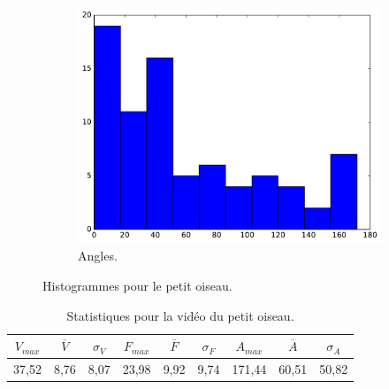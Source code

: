 \begin{appendices}
\begin{figure}[htbp]
\begin{subfigure}[t]{\subImgWclicks}
			\centering
			\includegraphics[width=\textwidth]{figures/ch3/bird_angle}
			\caption{Angles.}
			\label{fig:bird_angle}
		\end{subfigure}
		\caption[Histogrammes pour le petit oiseau]{Histogrammes pour le petit oiseau.}
		\label{fig:histBird}
	\end{figure}
	
\begin{table}
	\centering
	\begin{tabular}{c c c c c c c c c}
		$V_{max}$	& $\overline{V}$	& $\sigma_{V}$	& $F_{max}$	& $\overline{F}$	& $\sigma_{F}$	& $A_{max}$	& $\overline{A}$	& $\sigma_{A}$	\bigstrut[b] \\ \hline

		37,52		& 8,76				& 8,07			& 23,98		& 9,92				& 9,74			& 171,44	& 60,51				& 50,82			\bigstrut[t] \\
	\end{tabular}
	\caption[Statistiques pour la vidéo du petit oiseau]{Statistiques pour la vidéo du petit oiseau.}
	\label{tab:bird_stats}
\end{table}





\end{appendices}
